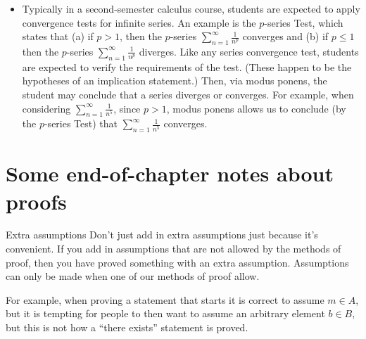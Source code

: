 \documentclass{book}
\theoremstyle{ekimcustom}
\begin{document}
\begin{itemize}
\item Typically in a second-semester calculus course, students are expected to apply convergence tests for infinite series. An example is the $p$-series Test, which states that (a) if $p > 1$, then the $p$-series $\sum_{n=1}^\infty \frac{1}{n^p}$ converges and (b) if $p \leq 1$ then the $p$-series $\sum_{n=1}^\infty \frac{1}{n^p}$ diverges. Like any series convergence test, students are expected to verify the requirements of the test. (These happen to be the hypotheses of an implication statement.) Then, via modus ponens, the student may conclude that a series diverges or converges. For example, when considering $\sum_{n=1}^\infty \frac{1}{n^5}$, since $p >1$, modus ponens allows us to conclude (by the $p$-series Test) that $\sum_{n=1}^\infty \frac{1}{n^5}$ converges. 

\end{itemize}


\section{Some end-of-chapter notes about proofs}

\begin{bwarning}{}{Extra assumptions}
Don't just add in extra assumptions just because it's convenient. If you add in assumptions that are not allowed by the methods of proof, then you have proved something with an extra assumption. Assumptions can only be made when one of our methods of proof allow. 
\end{bwarning}
For example, when proving a statement that starts  it is correct to assume $m \in A$, but it is tempting for people to then want to assume an arbitrary element $b \in B$, but this is not how a ``there exists'' statement is proved.
\end{document}
